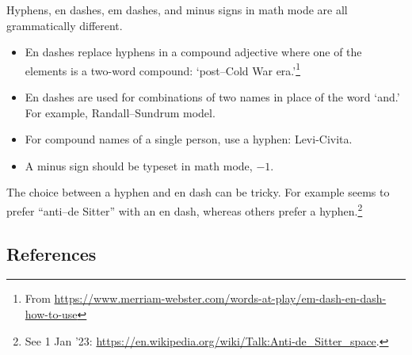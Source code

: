 Hyphens, en dashes, em dashes, and minus signs in math mode are all grammatically different.
\begin{itemize}
	\item En dashes replace hyphens in a compound adjective where one of the elements is a two-word compound: `post--Cold War era.'\footnote{From \url{https://www.merriam-webster.com/words-at-play/em-dash-en-dash-how-to-use}}
	\item En dashes are used for combinations of two names in place of the word `and.' For example, Randall--Sundrum model.
	\item For compound names of a single person, use a hyphen: Levi-Civita.
	\item A minus sign should be typeset in math mode, $-1$.
\end{itemize}
The choice between a hyphen and en dash can be tricky. For example  seems to prefer ``anti--de Sitter'' with an en dash, whereas others prefer a hyphen.\footnote{See 1 Jan '23: \url{https://en.wikipedia.org/wiki/Talk:Anti-de_Sitter_space}.}


\subsection{References}

